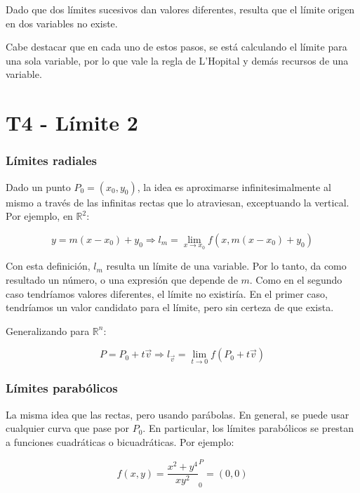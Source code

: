 \documentclass{article}
\renewcommand{\Bbb}{\mathbb}
\begin{document}
Dado que dos límites sucesivos dan valores diferentes, resulta que el límite origen en dos variables no existe.

Cabe destacar que en cada uno de estos pasos, se está calculando el límite para una sola variable, por lo que vale la regla de L'Hopital y demás recursos de una variable.

\section{T4 - Límite 2}

\subsubsection{Límites radiales}

Dado un punto $P_0 = (x_0, y_0)$, la idea es aproximarse infinitesimalmente al mismo a través de las infinitas rectas que lo atraviesan, exceptuando la vertical. Por ejemplo, en $\Bbb R^2$:

\begin{equation}
y = m (x-x_0) + y_0 \Rightarrow l_m = \lim_{x \rightarrow x_0} f(x, m (x-x_0) + y_0)
\end{equation}

Con esta definición, $l_m$ resulta un límite de una variable. Por lo tanto, da como resultado un número, o una expresión que depende de $m$. Como en el segundo caso tendríamos valores diferentes, el límite no existiría. En el primer caso, tendríamos un valor candidato para el límite, pero sin certeza de que exista.

Generalizando para $\Bbb R^n$:

\begin{equation}
P = P_0 + t \overrightarrow{v} \Rightarrow l_{\overrightarrow{v}} = \lim_{t \rightarrow 0} f(P_0 + t \overrightarrow{v})
\end{equation}

\subsubsection{Límites parabólicos}

La misma idea que las rectas, pero usando parábolas. En general, se puede usar cualquier curva que pase por $P_0$. En particular, los límites parabólicos se prestan a funciones cuadráticas o bicuadráticas. Por ejemplo:

\begin{equation}
f(x,y) = \frac{x^2 + y^4}{xy^2} ^ P_0 = (0,0)
\end{equation}
\end{document}
